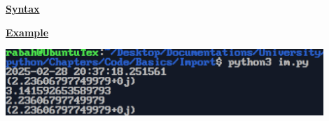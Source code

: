 \vspace{1cm}
\textbf{\underline{Syntax}}\\[0.1cm]



\vspace{0.8cm}

\textbf{\underline{Example}}\\[0.1cm]



\vspace{0.35cm}
\begin{center}
    \includegraphics[width = 0.9\textwidth]{Chapters/ScreenShot/Basics/Import/imOutput.png}
\end{center}

\newpage



